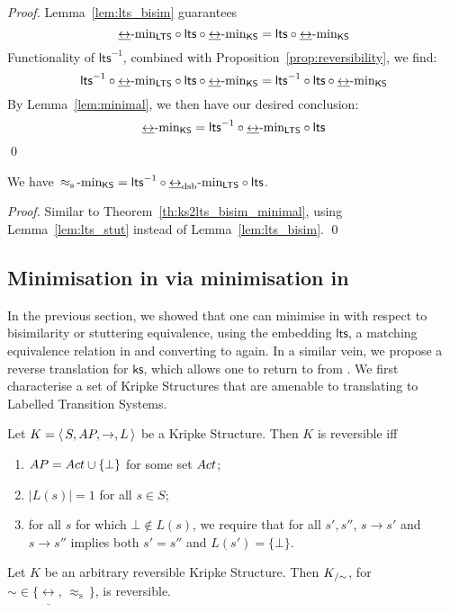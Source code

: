 \documentclass{llncs}
\newcommand{\kstrans}{\to}
\newcommand{\bisim}{\mbox{$\underline{\leftrightarrow}$}}
\newcommand{\dsbbisim}{\mbox{$\underline{\leftrightarrow}_{\mathrm{dsb}}$}}
\newcommand{\stuttering}{\,\approx_{\mathrm{s}}\,}
\newcommand{\lts}{\mathsf{lts}}
\newcommand{\ltsrev}{\lts^{-1}}
\newcommand{\ks}{\mathsf{ks}}
\begin{document}
\begin{proof}
Lemma~\ref{lem:lts_bisim} guarantees
\[
\minLTS{\bisim} \circ \lts \circ \minKS{\bisim}
=
\lts \circ \minKS{\bisim}
\]
Functionality of $\ltsrev$, combined with Proposition~\ref{prop:reversibility},
we find:
\[
\ltsrev \circ \minLTS{\bisim} \circ \lts \circ \minKS{\bisim}
=
\ltsrev \circ \lts\circ \minKS{\bisim}
\]
By Lemma~\ref{lem:minimal}, we then have our desired conclusion:
$$
\minKS{\bisim}
=
\ltsrev \circ \minLTS{\bisim} \circ \lts
$$
\qed
\end{proof}


\begin{theorem}
\label{th:ks2lts_stut_minimal}
We have  $\minKS{\stuttering}
= \ltsrev \circ \minLTS{\dsbbisim} \circ \lts$.
\end{theorem}

\begin{proof}
Similar to
Theorem~\ref{th:ks2lts_bisim_minimal}, using Lemma~\ref{lem:lts_stut}
instead of Lemma~\ref{lem:lts_bisim}. \qed
\end{proof}


\subsection{Minimisation in \LTS via minimisation in \KS}

In the previous section, we showed that one can minimise in \KS
with respect to bisimilarity or stuttering equivalence,
using the embedding $\lts$, a matching equivalence relation in \LTS and
converting to \KS again. In a similar vein, we propose a reverse
translation for $\ks$, which allows one to return to \LTS from
\KS. We first characterise a set of Kripke Structures that are amenable
to translating to Labelled Transition Systems.

\begin{definition} Let $K = \tuple{S, \AP, \kstrans, L}$ be a Kripke
Structure. Then $K$ is reversible iff
\begin{enumerate}
\item $AP = Act \cup \{\bot\}$ for some set $Act$;
\item $|L(s)| = 1$ for all $s \in S$;
\item for all $s$ for which $\bot \notin L(s)$, we require that
for all $s', s''$, $s \kstrans s'$ and $s \kstrans s''$ implies both $s' = s''$ and
$L(s') = \{\bot\}$.

\end{enumerate}

\end{definition}
\begin{proposition}
\label{prop:reversibility2}
Let $K$ be an arbitrary reversible Kripke Structure.
Then ${K}_{/\sim}$, for $\sim \in \{\bisim, \stuttering\}$,
is reversible.

\end{proposition}
\end{document}
